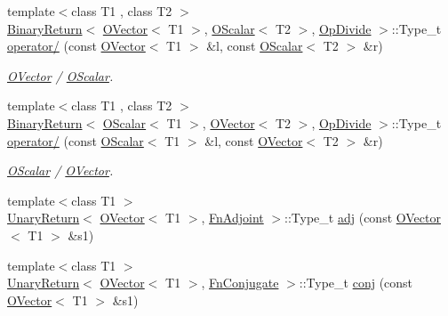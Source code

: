 \begin{DoxyCompactItemize}
{\footnotesize template$<$class T1 , class T2 $>$ }\\\mbox{\hyperlink{structENSEM_1_1BinaryReturn}{Binary\+Return}}$<$ \mbox{\hyperlink{classENSEM_1_1OVector}{O\+Vector}}$<$ T1 $>$, \mbox{\hyperlink{classENSEM_1_1OScalar}{O\+Scalar}}$<$ T2 $>$, \mbox{\hyperlink{structENSEM_1_1OpDivide}{Op\+Divide}} $>$\+::Type\+\_\+t \mbox{\hyperlink{group__obsvector_ga7000d5ea0ebcbe74abe855326d6e82cd}{operator/}} (const \mbox{\hyperlink{classENSEM_1_1OVector}{O\+Vector}}$<$ T1 $>$ \&l, const \mbox{\hyperlink{classENSEM_1_1OScalar}{O\+Scalar}}$<$ T2 $>$ \&r)
\begin{DoxyCompactList}\small\item\em \mbox{\hyperlink{classENSEM_1_1OVector}{O\+Vector}} / \mbox{\hyperlink{classENSEM_1_1OScalar}{O\+Scalar}}. \end{DoxyCompactList}\item 
{\footnotesize template$<$class T1 , class T2 $>$ }\\\mbox{\hyperlink{structENSEM_1_1BinaryReturn}{Binary\+Return}}$<$ \mbox{\hyperlink{classENSEM_1_1OScalar}{O\+Scalar}}$<$ T1 $>$, \mbox{\hyperlink{classENSEM_1_1OVector}{O\+Vector}}$<$ T2 $>$, \mbox{\hyperlink{structENSEM_1_1OpDivide}{Op\+Divide}} $>$\+::Type\+\_\+t \mbox{\hyperlink{group__obsvector_gaf4f1f6a048cad788e11294a211380fab}{operator/}} (const \mbox{\hyperlink{classENSEM_1_1OScalar}{O\+Scalar}}$<$ T1 $>$ \&l, const \mbox{\hyperlink{classENSEM_1_1OVector}{O\+Vector}}$<$ T2 $>$ \&r)
\begin{DoxyCompactList}\small\item\em \mbox{\hyperlink{classENSEM_1_1OScalar}{O\+Scalar}} / \mbox{\hyperlink{classENSEM_1_1OVector}{O\+Vector}}. \end{DoxyCompactList}\item 
{\footnotesize template$<$class T1 $>$ }\\\mbox{\hyperlink{structENSEM_1_1UnaryReturn}{Unary\+Return}}$<$ \mbox{\hyperlink{classENSEM_1_1OVector}{O\+Vector}}$<$ T1 $>$, \mbox{\hyperlink{structENSEM_1_1FnAdjoint}{Fn\+Adjoint}} $>$\+::Type\+\_\+t \mbox{\hyperlink{group__obsvector_gab801d265f143d9dca7ac1e3298640bf7}{adj}} (const \mbox{\hyperlink{classENSEM_1_1OVector}{O\+Vector}}$<$ T1 $>$ \&s1)
\item 
{\footnotesize template$<$class T1 $>$ }\\\mbox{\hyperlink{structENSEM_1_1UnaryReturn}{Unary\+Return}}$<$ \mbox{\hyperlink{classENSEM_1_1OVector}{O\+Vector}}$<$ T1 $>$, \mbox{\hyperlink{structENSEM_1_1FnConjugate}{Fn\+Conjugate}} $>$\+::Type\+\_\+t \mbox{\hyperlink{group__obsvector_ga77a1805866a66a7f5215fb784b9c2725}{conj}} (const \mbox{\hyperlink{classENSEM_1_1OVector}{O\+Vector}}$<$ T1 $>$ \&s1)

\end{DoxyCompactItemize}
